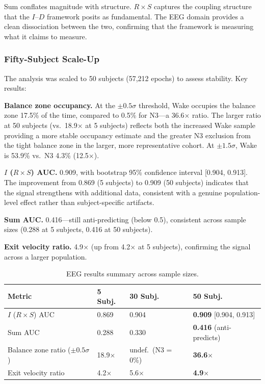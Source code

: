 \documentclass[aip,cha,reprint,amsmath,amssymb]{revtex4-2}
\begin{document}
Sum conflates magnitude with structure. $R \times S$ captures the coupling structure that the $I$--$D$ framework posits as fundamental. The EEG domain provides a clean dissociation between the two, confirming that the framework is measuring what it claims to measure.

\subsubsection{Fifty-Subject Scale-Up}

The analysis was scaled to 50 subjects (57,212 epochs) to assess stability. Key results:

\textbf{Balance zone occupancy.} At the $\pm 0.5\sigma$ threshold, Wake occupies the balance zone 17.5\% of the time, compared to 0.5\% for N3---a 36.6$\times$ ratio. The larger ratio at 50 subjects (vs.\ 18.9$\times$ at 5 subjects) reflects both the increased Wake sample providing a more stable occupancy estimate and the greater N3 exclusion from the tight balance zone in the larger, more representative cohort. At $\pm 1.5\sigma$, Wake is 53.9\% vs.\ N3 4.3\% (12.5$\times$).

\textbf{$I$ ($R \times S$) AUC.} 0.909, with bootstrap 95\% confidence interval [0.904, 0.913]. The improvement from 0.869 (5 subjects) to 0.909 (50 subjects) indicates that the signal strengthens with additional data, consistent with a genuine population-level effect rather than subject-specific artifacts.

\textbf{Sum AUC.} 0.416---still anti-predicting (below 0.5), consistent across sample sizes (0.288 at 5 subjects, 0.416 at 50 subjects).

\textbf{Exit velocity ratio.} 4.9$\times$ (up from 4.2$\times$ at 5 subjects), confirming the signal across a larger population.

\begin{table}[h]
\caption{\label{tab:eeg}EEG results summary across sample sizes.}
\centering
\begin{tabular}{llll}
Metric & 5 Subj. & 30 Subj. & 50 Subj. \\
\hline
$I$ ($R \times S$) AUC & 0.869 & 0.904 & \textbf{0.909} [0.904, 0.913] \\
Sum AUC & 0.288 & 0.330 & \textbf{0.416} (anti-predicts) \\
Balance zone ratio ($\pm 0.5\sigma$) & 18.9$\times$ & undef.\ (N3 = 0\%) & \textbf{36.6$\times$} \\
Exit velocity ratio & 4.2$\times$ & 5.6$\times$ & \textbf{4.9$\times$} \\
\end{tabular}
\end{table}
\end{document}

